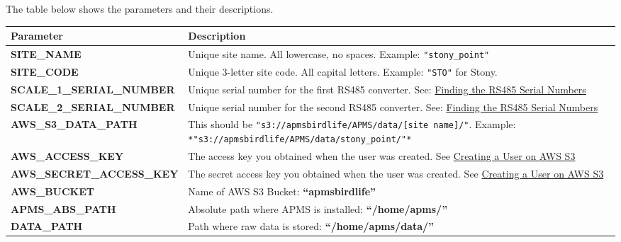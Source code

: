 \documentclass[
  letterpaper,
]{scrbook}
\begin{document}
The table below shows the parameters and their descriptions.

\begin{longtable}[]{@{}
  >{\raggedright\arraybackslash}p{}
  >{\raggedright\arraybackslash}p{}@{}}
\toprule\noalign{}
\begin{minipage}[b]{\linewidth}\raggedright
Parameter
\end{minipage} & \begin{minipage}[b]{\linewidth}\raggedright
Description
\end{minipage} \\
\midrule\noalign{}
\endhead
\bottomrule\noalign{}
\endlastfoot
\textbf{SITE\_NAME} & Unique site name. All lowercase, no spaces.
Example: \texttt{"stony\_point"} \\
\textbf{SITE\_CODE} & Unique 3-letter site code. All capital letters.
Example: \texttt{"STO"} for Stony. \\
\textbf{SCALE\_1\_SERIAL\_NUMBER} & Unique serial number for the first
RS485 converter. See:
\hyperref[Findingux5cux2520theux5cux2520RS485ux5cux2520Serialux5cux2520Numbers]{Finding
the RS485 Serial Numbers} \\
\textbf{SCALE\_2\_SERIAL\_NUMBER} & Unique serial number for the second
RS485 converter. See:
\hyperref[Findingux5cux2520theux5cux2520RS485ux5cux2520Serialux5cux2520Numbers]{Finding
the RS485 Serial Numbers} \\
\textbf{AWS\_S3\_DATA\_PATH} & This should be
\texttt{"s3://apmsbirdlife/APMS/data/{[}site\ name{]}/"}. Example:
\texttt{*"s3://apmsbirdlife/APMS/data/stony\_point/"*} \\
\textbf{AWS\_ACCESS\_KEY} & The access key you obtained when the user
was created. See
\hyperref[Creatingux5cux2520aux5cux2520Userux5cux2520onux5cux2520AWSux5cux2520S3]{Creating
a User on AWS S3} \\
\textbf{AWS\_SECRET\_ACCESS\_KEY} & The secret access key you obtained
when the user was created. See
\hyperref[Creatingux5cux2520aux5cux2520Userux5cux2520onux5cux2520AWSux5cux2520S3]{Creating
a User on AWS S3} \\
\textbf{AWS\_BUCKET} & Name of AWS S3 Bucket:
\textbf{``apmsbirdlife''} \\
\textbf{APMS\_ABS\_PATH} & Absolute path where APMS is installed:
\textbf{``/home/apms/''} \\
\textbf{DATA\_PATH} & Path where raw data is stored:
\textbf{``/home/apms/data/''} \\

\end{longtable}
\end{document}
